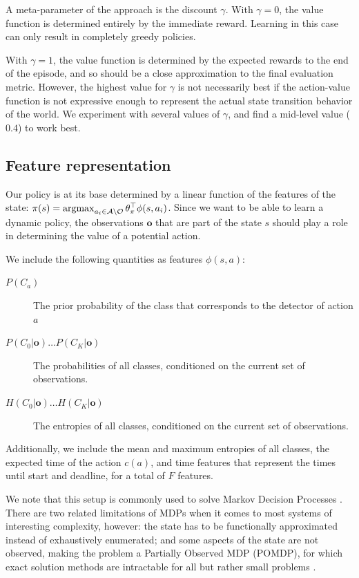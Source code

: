 A meta-parameter of the approach is the discount $\gamma$.
With $\gamma=0$, the value function is determined entirely by the immediate reward.
Learning in this case can only result in completely greedy policies.

With $\gamma=1$, the value function is determined by the expected rewards to the end of the episode, and so should be a close approximation to the final evaluation metric.
However, the highest value for $\gamma$ is not necessarily best if the action-value function is not expressive enough to represent the actual state transition behavior of the world.
We experiment with several values of $\gamma$, and find a mid-level value ($0.4$) to work best.

\subsection{Feature representation}
Our policy is at its base determined by a linear function of the features of the state: $\pi(s) = \argmax_{a_i \in \mathcal{A} \setminus \mathcal{O}} \theta_\pi^\top \phi(s,a_i)$.
Since we want to be able to learn a dynamic policy, the observations $\mathbf{o}$ that are part of the state $s$ should play a role in determining the value of a potential action.

We include the following quantities as features $\phi(s,a)$:
\begin{description}
\item[$P(C_a)$] The prior probability of the class that corresponds to the detector of action $a$
\item[$P(C_0|\mathbf{o}) \ldots P(C_K|\mathbf{o})$] The probabilities of all classes, conditioned on the current set of observations.
\item[$H(C_0|\mathbf{o}) \ldots H(C_K|\mathbf{o})$] The entropies of all classes, conditioned on the current set of observations.
\end{description}

Additionally, we include the mean and maximum entropies of all classes, the expected time of the action $c(a)$, and time features that represent the times until start and deadline, for a total of $F$ features.

We note that this setup is commonly used to solve Markov Decision Processes \cite{Sutton1998}.
There are two related limitations of MDPs when it comes to most systems of interesting complexity, however: the state has to be functionally approximated instead of exhaustively enumerated; and some aspects of the state are not observed, making the problem a Partially Observed MDP (POMDP), for which exact solution methods are intractable for all but rather small problems \cite{Roy2002}.

